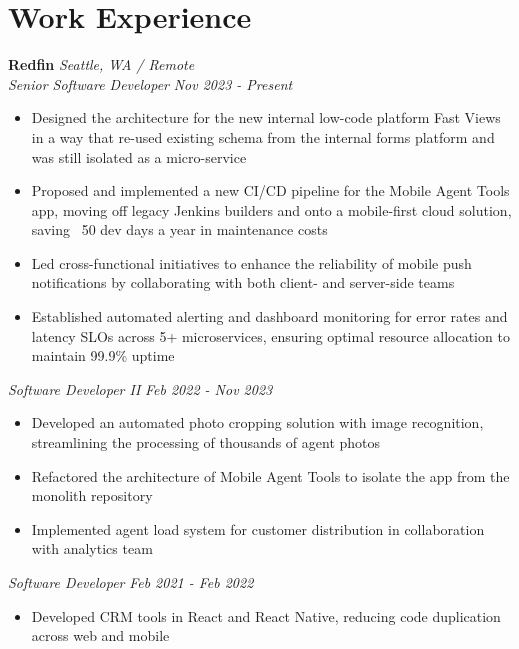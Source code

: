 \documentclass[a4paper,11pt]{article}
\begin{document}
\section{Work Experience}
\vspace{5pt}
\textbf{Redfin} \hspace*{\fill}\emph{Seattle, WA / Remote} \\
\emph{Senior Software Developer} \hspace*{\fill} \emph{Nov 2023 - Present}
\vspace{1.5pt}
\begin{itemize}[noitemsep, topsep=-1ex]
\item Designed the architecture for the new internal low-code platform Fast Views in a way that re-used existing schema from the internal forms platform and was still isolated as a micro-service
\item Proposed and implemented a new CI/CD pipeline for the Mobile Agent Tools app, moving off legacy Jenkins builders and onto a mobile-first cloud solution, saving ~50 dev days a year in maintenance costs
\item Led cross-functional initiatives to enhance the reliability of mobile push notifications by collaborating with both client- and server-side teams
\item Established automated alerting and dashboard monitoring for error rates and latency SLOs across 5+ microservices, ensuring optimal resource allocation to maintain 99.9\% uptime
\end{itemize}
\vspace{1.5pt}
\emph{Software Developer II} \hspace*{\fill} \emph{Feb 2022 - Nov 2023}
\vspace{1.5pt}
\begin{itemize}[noitemsep, topsep=-1ex]
\item Developed an automated photo cropping solution with image recognition, streamlining the processing of thousands of agent photos
\item Refactored the architecture of Mobile Agent Tools to isolate the app from the monolith repository
\item Implemented agent load system for customer distribution in collaboration with analytics team
\end{itemize}
\vspace{1.5pt}
\emph{Software Developer} \hspace*{\fill} \emph{Feb 2021 - Feb 2022}
\vspace{1.5pt}
\begin{itemize}[noitemsep, topsep=-1ex]
\item Developed CRM tools in React and React Native, reducing code duplication across web and mobile
\end{itemize}
\vspace{1.5pt}
\end{document}
